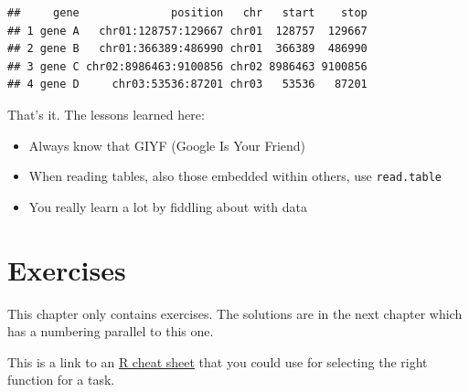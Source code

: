 \documentclass[]{book}
\newenvironment{Shaded}{\begin{snugshade}}{\end{snugshade}}
\newcommand{\DataTypeTok}[1]{\textcolor[rgb]{0.13,0.29,0.53}{#1}}
\newcommand{\DecValTok}[1]{\textcolor[rgb]{0.00,0.00,0.81}{#1}}
\newcommand{\KeywordTok}[1]{\textcolor[rgb]{0.13,0.29,0.53}{\textbf{#1}}}
\newcommand{\NormalTok}[1]{#1}
\newcommand{\OperatorTok}[1]{\textcolor[rgb]{0.81,0.36,0.00}{\textbf{#1}}}
\newcommand{\StringTok}[1]{\textcolor[rgb]{0.31,0.60,0.02}{#1}}
\providecommand{\tightlist}{%
  \setlength{\itemsep}{0pt}\setlength{\parskip}{0pt}}
\begin{document}
\begin{Shaded}
\end{Shaded}

\begin{verbatim}
##     gene              position   chr   start    stop
## 1 gene A   chr01:128757:129667 chr01  128757  129667
## 2 gene B   chr01:366389:486990 chr01  366389  486990
## 3 gene C chr02:8986463:9100856 chr02 8986463 9100856
## 4 gene D     chr03:53536:87201 chr03   53536   87201
\end{verbatim}

That's it. The lessons learned here:

\begin{itemize}
\tightlist
\item
  Always know that GIYF (Google Is Your Friend)
\item
  When reading tables, also those embedded within others, use \texttt{read.table}
\item
  You really learn a lot by fiddling about with data
\end{itemize}

\hypertarget{exercises}{%
\chapter{Exercises}\label{exercises}}

This chapter only contains exercises. The solutions are in the next chapter which has a numbering parallel to this one.

This is a link to an \href{figures/R_cheatsheet.pdf}{R cheat sheet} that you could use for selecting the right function for a task.
\end{document}
